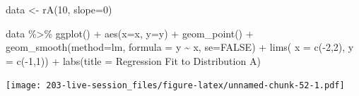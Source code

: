 \documentclass[
]{book}
\newenvironment{Shaded}{\begin{snugshade}}{\end{snugshade}}
\newcommand{\AttributeTok}[1]{\textcolor[rgb]{0.77,0.63,0.00}{#1}}
\newcommand{\ConstantTok}[1]{\textcolor[rgb]{0.00,0.00,0.00}{#1}}
\newcommand{\DecValTok}[1]{\textcolor[rgb]{0.00,0.00,0.81}{#1}}
\newcommand{\FunctionTok}[1]{\textcolor[rgb]{0.00,0.00,0.00}{#1}}
\newcommand{\NormalTok}[1]{#1}
\newcommand{\OtherTok}[1]{\textcolor[rgb]{0.56,0.35,0.01}{#1}}
\newcommand{\SpecialCharTok}[1]{\textcolor[rgb]{0.00,0.00,0.00}{#1}}
\newcommand{\StringTok}[1]{\textcolor[rgb]{0.31,0.60,0.02}{#1}}
\theoremstyle{definition}
\theoremstyle{definition}
\theoremstyle{definition}
\theoremstyle{definition}
\theoremstyle{remark}
\begin{document}
\begin{Shaded}
\begin{Highlighting}[]
\NormalTok{data }\OtherTok{\textless{}{-}}  \FunctionTok{rA}\NormalTok{(}\DecValTok{10}\NormalTok{, }\AttributeTok{slope=}\DecValTok{0}\NormalTok{)}

\NormalTok{data }\SpecialCharTok{\%\textgreater{}\%} 
  \FunctionTok{ggplot}\NormalTok{() }\SpecialCharTok{+} 
  \FunctionTok{aes}\NormalTok{(}\AttributeTok{x=}\NormalTok{x, }\AttributeTok{y=}\NormalTok{y) }\SpecialCharTok{+} 
  \FunctionTok{geom\_point}\NormalTok{() }\SpecialCharTok{+} 
  \FunctionTok{geom\_smooth}\NormalTok{(}\AttributeTok{method=}\StringTok{\textquotesingle{}lm\textquotesingle{}}\NormalTok{, }\AttributeTok{formula =} \StringTok{\textquotesingle{}y \textasciitilde{} x\textquotesingle{}}\NormalTok{, }\AttributeTok{se=}\ConstantTok{FALSE}\NormalTok{) }\SpecialCharTok{+} 
  \FunctionTok{lims}\NormalTok{(}
    \AttributeTok{x =} \FunctionTok{c}\NormalTok{(}\SpecialCharTok{{-}}\DecValTok{2}\NormalTok{,}\DecValTok{2}\NormalTok{), }
    \AttributeTok{y =} \FunctionTok{c}\NormalTok{(}\SpecialCharTok{{-}}\DecValTok{1}\NormalTok{,}\DecValTok{1}\NormalTok{)) }\SpecialCharTok{+} 
  \FunctionTok{labs}\NormalTok{(}\AttributeTok{title =} \StringTok{\textquotesingle{}Regression Fit to Distribution A\textquotesingle{}}\NormalTok{)}
\end{Highlighting}
\end{Shaded}

\texttt{[image: 203-live-session\_files/figure-latex/unnamed-chunk-52-1.pdf]}
\end{document}
